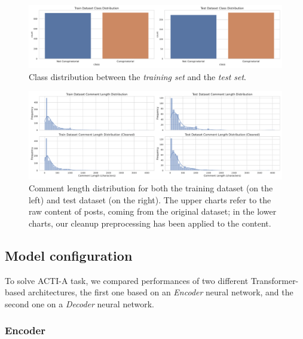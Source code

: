 \documentclass[11pt]{article}
\begin{document}
\begin{enumerate*}[label=(\roman*)]
\begin{figure}
  \centering
  \includegraphics[width=\textwidth]{figures/class_distribution.pdf}
  \caption{
    Class distribution between the \emph{training set} and the \emph{test set}.
  }
  \label{fig:class-frequency}
\end{figure}

\begin{figure}
  \centering
  \includegraphics[width=\textwidth]{figures/comment_length_distribution.pdf}
  \caption{
    Comment length distribution for both the training dataset (on the left) and test dataset
    (on the right).
    The upper charts refer to the raw content of posts, coming from the original dataset;
    in the lower charts, our cleanup preprocessing has been applied to the content.
  }
  \label{fig:words-distribution}
\end{figure}

\subsection{Model configuration}\label{sec:model-config}
To solve ACTI-A task, we compared performances of two different Transformer-based architectures,
the first one based on an \emph{Encoder} neural network, and the second one on a \emph{Decoder} neural network. 




\subsubsection{Encoder} 


\end{enumerate*}
\end{document}
